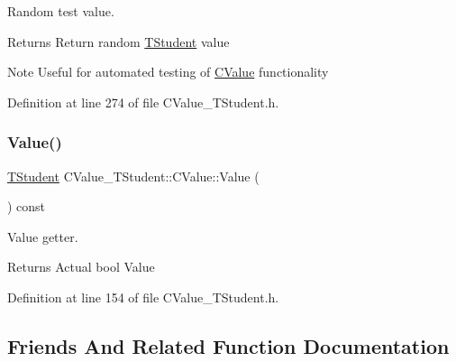 Random test value. 

\begin{DoxyReturn}{Returns}
Return random \hyperlink{struct_c_value___t_student_1_1_t_student}{T\+Student} value 
\end{DoxyReturn}
\begin{DoxyNote}{Note}
Useful for automated testing of \hyperlink{class_c_value___t_student_1_1_c_value}{C\+Value} functionality 
\end{DoxyNote}


Definition at line 274 of file C\+Value\+\_\+\+T\+Student.\+h.

\mbox{\label{class_c_value___t_student_1_1_c_value_a8b3771c6800a24fd9933dd1aaf30261a}} 
\subsubsection{\texorpdfstring{Value()}{Value()}}
{\footnotesize\ttfamily \hyperlink{struct_c_value___t_student_1_1_t_student}{T\+Student} C\+Value\+\_\+\+T\+Student\+::\+C\+Value\+::\+Value (\begin{DoxyParamCaption}{ }\end{DoxyParamCaption}) const\hspace{0.3cm}{\ttfamily [inline]}}



Value getter. 

\begin{DoxyReturn}{Returns}
Actual {\ttfamily bool} {\ttfamily Value} 
\end{DoxyReturn}


Definition at line 154 of file C\+Value\+\_\+\+T\+Student.\+h.



\subsection{Friends And Related Function Documentation}
\mbox{\label{class_c_value___t_student_1_1_c_value_a3d28097fae6bdd5a8146d9ab90f8b62f}} 
